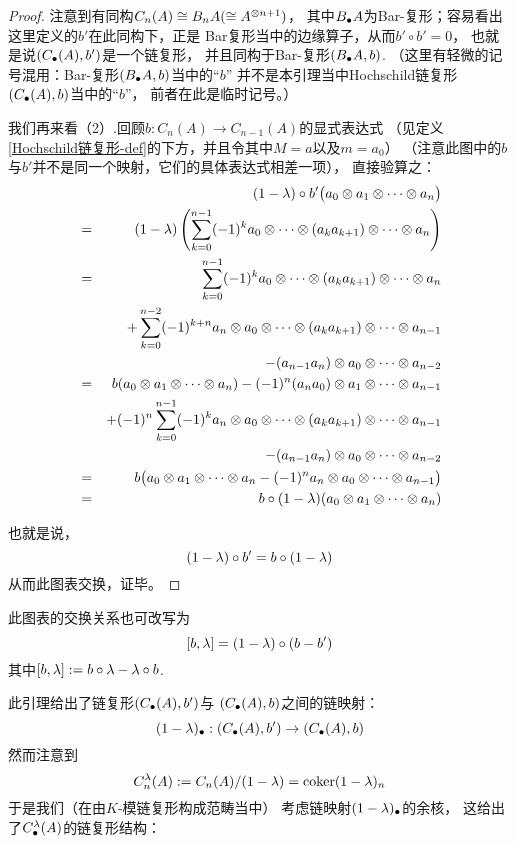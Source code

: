 \begin{proof}
注意到有同构$C_n(A)\cong B_nA(\cong A^{\otimes n+1})$，
其中$B_{\bullet} A$为Bar-复形；容易看出这里定义的$b'$在此同构下，正是
Bar复形当中的边缘算子，从而$b'\circ b'=0$，
也就是说$(C_{\bullet}(A),b')$是一个链复形，
并且同构于Bar-复形$(B_{\bullet} A, b)$.
（这里有轻微的记号混用：Bar-复形$(B_{\bullet} A, b)$当中的“$b$”
并不是本引理当中Hochschild链复形$(C_{\bullet}(A),b)$当中的“$b$”，
前者在此是临时记号。）\vs

我们再来看（2）.回顾$b:C_n(A)\to C_{n-1}(A)$的显式表达式
（见定义\ref{Hochschild链复形-def}的下方，并且令其中$M=a$以及$m=a_0$）
（注意此图中的$b$与$b'$并不是同一个映射，它们的具体表达式相差一项），
直接验算之：
\begin{eqnarray*}
& & (1-\lambda)\circ b'
        \big(
             a_0\otimes a_1\otimes\cdots\otimes a_n
        \big)\\
&=&
    (1-\lambda)\left(
               \sum_{k=0}^{n-1}(-1)^k
                   a_0\otimes\cdots\otimes(a_ka_{k+1})\otimes\cdots\otimes a_n
            \right)\\
&=&
    \sum_{k=0}^{n-1}(-1)^k
         a_0\otimes\cdots\otimes(a_ka_{k+1})\otimes\cdots\otimes a_n\\
& &
    +\sum_{k=0}^{n-2}(-1)^{k+n}
         a_n\otimes a_0\otimes\cdots\otimes(a_ka_{k+1})\otimes\cdots\otimes a_{n-1}\\
& &
    -(a_{n-1}a_n)\otimes a_0\otimes\cdots\otimes a_{n-2}\\
&=&
    b(a_0\otimes a_1\otimes\cdots\otimes a_n)
    -(-1)^n(a_na_0)\otimes a_1\otimes\cdots\otimes a_{n-1}\\
& &
    +(-1)^n
    \sum_{k=0}^{n-1}(-1)^k
        a_n\otimes a_0\otimes\cdots\otimes(a_ka_{k+1})\otimes\cdots\otimes a_{n-1}\\
& &
    -(a_{n-1}a_n)\otimes a_0\otimes\cdots\otimes a_{n-2}\\
&=&
    b\big(
       a_0\otimes a_1\otimes\cdots\otimes a_n
       -(-1)^na_n\otimes a_0\otimes\cdots\otimes a_{n-1}
     \big)\\
&=&
    b\circ(1-\lambda)(a_0\otimes a_1\otimes\cdots\otimes a_n)
\end{eqnarray*}

也就是说，
$$(1-\lambda)\circ b'=b\circ(1-\lambda)$$
从而此图表交换，证毕。
\end{proof}

此图表的交换关系也可改写为
$$[b,\lambda]=(1-\lambda)\circ(b-b')$$
其中$[b,\lambda]:=b\circ\lambda-\lambda\circ b$.\vs

此引理给出了链复形$(C_{\bullet}(A),b')$与
$(C_{\bullet}(A),b)$之间的链映射：
$$(1-\lambda)_{\bullet}:(C_{\bullet}(A),b')\to(C_{\bullet}(A),b)$$
然而注意到
$$C_n^{\lambda}(A):=C_n(A)/(1-\lambda)=\operatorname{coker} (1-\lambda)_n$$
于是我们（在由$K$-模链复形构成范畴当中）
考虑链映射$(1-\lambda)_{\bullet}$的余核，
这给出了$C_{\bullet}^{\lambda}(A)$的链复形结构：

